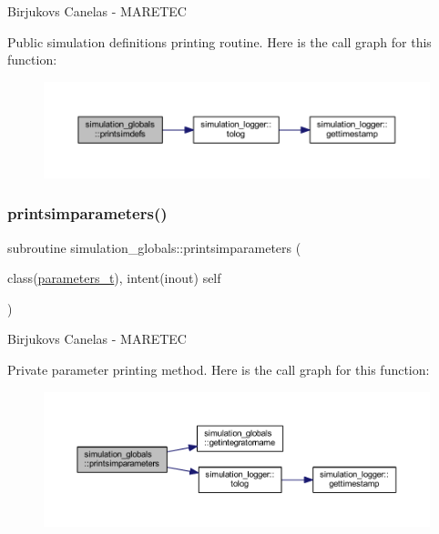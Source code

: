 Birjukovs Canelas -\/ M\+A\+R\+E\+T\+EC 

Public simulation definitions printing routine. Here is the call graph for this function\+:
\nopagebreak
\begin{figure}[H]
\begin{center}
\leavevmode
\includegraphics[width=350pt]{namespacesimulation__globals_ad90d6959da1d43e2cd1febff82187ed5_cgraph}
\end{center}
\end{figure}
\mbox{\label{namespacesimulation__globals_a0b17b2f2e9e7dbbad7c9d735217c1ee1}} 
\subsubsection{\texorpdfstring{printsimparameters()}{printsimparameters()}}
{\footnotesize\ttfamily subroutine simulation\+\_\+globals\+::printsimparameters (\begin{DoxyParamCaption}\item[{class(\mbox{\hyperlink{structsimulation__globals_1_1parameters__t}{parameters\+\_\+t}}), intent(inout)}]{self }\end{DoxyParamCaption})\hspace{0.3cm}{\ttfamily [private]}}



Birjukovs Canelas -\/ M\+A\+R\+E\+T\+EC 

Private parameter printing method. Here is the call graph for this function\+:
\nopagebreak
\begin{figure}[H]
\begin{center}
\leavevmode
\includegraphics[width=350pt]{namespacesimulation__globals_a0b17b2f2e9e7dbbad7c9d735217c1ee1_cgraph}
\end{center}
\end{figure}
\mbox{\label{namespacesimulation__globals_a1fc4653684d73efecdbd140b6cafe541}} 
